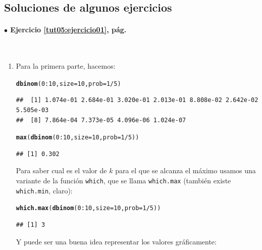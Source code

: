 \documentclass[10pt,a4paper]{article}\usepackage[]{graphicx}\usepackage[]{color}
\makeatletter
\newcommand{\hlnum}[1]{\textcolor[rgb]{0.686,0.059,0.569}{#1}}%
\newcommand{\hlopt}[1]{\textcolor[rgb]{0,0,0}{#1}}%
\newcommand{\hlstd}[1]{\textcolor[rgb]{0.345,0.345,0.345}{#1}}%
\newcommand{\hlkwc}[1]{\textcolor[rgb]{0.333,0.667,0.333}{#1}}%
\newcommand{\hlkwd}[1]{\textcolor[rgb]{0.737,0.353,0.396}{\textbf{#1}}}%
\newenvironment{kframe}{%
 \def\at@end@of@kframe{}%
 \ifinner\ifhmode%
  \def\at@end@of@kframe{\end{minipage}}%
  \begin{minipage}{\columnwidth}%
 \fi\fi%
 \def\FrameCommand##1{\hskip\@totalleftmargin \hskip-\fboxsep
 \colorbox{shadecolor}{##1}\hskip-\fboxsep
     \hskip-\linewidth \hskip-\@totalleftmargin \hskip\columnwidth}%
 \MakeFramed {\advance\hsize-\width
   \@totalleftmargin\z@ \linewidth\hsize
   \@setminipage}}%
 {\par\unskip\endMakeFramed%
 \at@end@of@kframe}
\newenvironment{knitrout}{}{} %
\makeatother
\begin{document}
\subsection*{Soluciones de algunos ejercicios}
\label{tut05:subsec:SolucionesAlgunosEjercicios}

\paragraph{\bf $\bullet$ Ejercicio \ref{tut05:ejercicio01}, pág. \pageref{tut05:ejercicio01}}
\label{tut05:ejercicio01:sol}\quad\\

\begin{enumerate}
  \item Para la primera parte, hacemos:

\begin{knitrout}
\color{fgcolor}\begin{kframe}
\begin{alltt}
\hlkwd{dbinom}\hlstd{(}\hlnum{0}\hlopt{:}\hlnum{10}\hlstd{,} \hlkwc{size}\hlstd{=} \hlnum{10}\hlstd{,} \hlkwc{prob}\hlstd{=}\hlnum{1}\hlopt{/}\hlnum{5}\hlstd{)}
\end{alltt}
\begin{verbatim}
##  [1] 1.074e-01 2.684e-01 3.020e-01 2.013e-01 8.808e-02 2.642e-02 5.505e-03
##  [8] 7.864e-04 7.373e-05 4.096e-06 1.024e-07
\end{verbatim}
\begin{alltt}
\hlkwd{max}\hlstd{(}\hlkwd{dbinom}\hlstd{(}\hlnum{0}\hlopt{:}\hlnum{10}\hlstd{,} \hlkwc{size}\hlstd{=} \hlnum{10}\hlstd{,} \hlkwc{prob}\hlstd{=}\hlnum{1}\hlopt{/}\hlnum{5}\hlstd{))}
\end{alltt}
\begin{verbatim}
## [1] 0.302
\end{verbatim}
\end{kframe}
\end{knitrout}
    Para saber cual es el valor de $k$ para el que se alcanza el máximo usamos una variante de la función {\tt which}, que se llama {\tt which.max} (también existe {\tt which.min}, claro):
\begin{knitrout}
\color{fgcolor}\begin{kframe}
\begin{alltt}
\hlkwd{which.max}\hlstd{(}\hlkwd{dbinom}\hlstd{(}\hlnum{0}\hlopt{:}\hlnum{10}\hlstd{,} \hlkwc{size}\hlstd{=} \hlnum{10}\hlstd{,} \hlkwc{prob}\hlstd{=}\hlnum{1}\hlopt{/}\hlnum{5}\hlstd{))}
\end{alltt}
\begin{verbatim}
## [1] 3
\end{verbatim}
\end{kframe}
\end{knitrout}
    Y puede ser una buena idea representar los valores gráficamente:


\end{enumerate}
\end{document}
